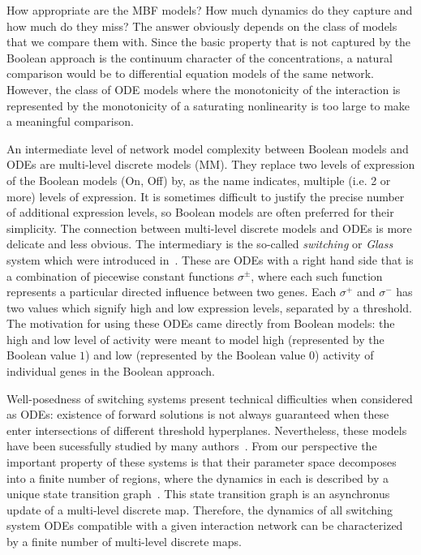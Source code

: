 \documentclass[12pt, notitlepage]{amsart}
\theoremstyle{definition}
\begin{document}
How appropriate are the MBF models?  How much dynamics do they capture and how much do they miss? The answer obviously depends on the class of models that we compare them with. Since the basic property that is not captured by the Boolean approach is the continuum character of the concentrations, a natural comparison would be to differential equation models of the same network.
However,  the class of ODE models where the monotonicity of the interaction is represented by the monotonicity of a saturating nonlinearity is too large to make a meaningful comparison.

An intermediate level of network model complexity between Boolean models and ODEs are multi-level discrete models (MM). They replace two levels of expression of the Boolean models (On, Off) by, as the name indicates,  multiple (i.e.  2 or more) levels of expression.
It is sometimes difficult to justify the precise number of additional expression levels, so Boolean models are often preferred for their simplicity.
The connection between multi-level discrete models and ODEs is more delicate and less obvious.
The intermediary is the so-called \textit{switching} or \textit{Glass} system which were introduced in~\cite{glass:kaufman:72,glass:kaufman:73,Thomas1973,SnoussiThomas93}. These are ODEs with a right hand side that is a combination of  piecewise constant functions $\sigma^\pm$, where each such function represents a particular directed influence between two genes.  Each $\sigma^+$ and $\sigma^-$ has two values which signify high and low expression levels, separated by a threshold. The motivation for using these ODEs came directly from Boolean models: the high and low level of activity were meant to model high (represented by the Boolean value $1$) and low (represented by the Boolean value $0$) activity of individual genes in the Boolean approach.

Well-posedness of switching systems present technical difficulties when considered as ODEs: existence of forward solutions is not always guaranteed when these enter intersections of different threshold hyperplanes. Nevertheless, these models have been sucessfully studied by many authors~\cite{deJong2004,Ironi2009, Ironi2011,snoussi89, edwards00,Chaves09}.
From our perspective the important property of these systems is that their parameter space decomposes into a finite number of regions, where the dynamics in each is described by a unique state transition graph~\cite{Cummins16,Gedeon20,gameiro:gedeon:kepley:mischaikow,Cummins2017b}. This state transition graph is an asynchronus update of a multi-level discrete map.
Therefore, the dynamics of all switching system ODEs compatible with a given interaction network can be characterized by a finite number of multi-level discrete maps.
\end{document}
